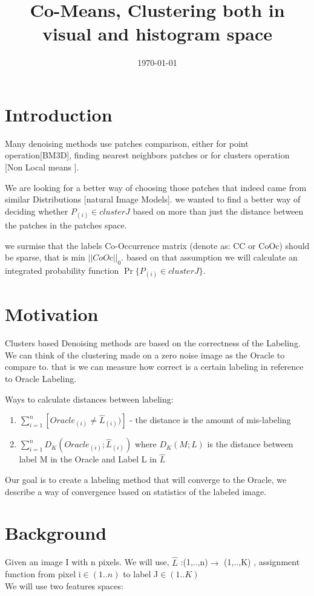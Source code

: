 \documentclass{article}
\title{Co-Means, Clustering both in visual and histogram space}
\author{}
\date{\today}
\begin{document}
\maketitle

\section{Introduction}
Many denoising methods use patches comparison, either for point operation[BM3D], finding nearest neighbors patches or for clusters operation [Non Local means ].

We are looking for a better way of choosing those patches that indeed came from similar Distributions [natural Image Models].
we wanted to find a better way of deciding whether $P_{(i)}\in cluster J$ based on more than just the distance between the patches in the patches space.

we surmise that the labels Co-Occurrence matrix (denote as: CC or CoOc) should be sparse, that is min $||CoOc||_0$. based on that assumption we will calculate an integrated probability function $\Pr \{P_{(i)}\in cluster J\}$.

\section{Motivation}
Clusters based Denoising methods are based on the correctness of the Labeling.
We can think of the clustering made on a zero noise image as the Oracle to compare to. that is we can measure how correct is a certain labeling in reference to Oracle Labeling.

Ways to calculate distances between labeling:
\begin{enumerate}
	\item $ \sum_{i=1}^{n} [Oracle_{(i)}\ne\hat{L}_{(i)})]$  - the distance is the amount of mis-labeling
	\item $ \sum_{i=1}^{n} D_K(Oracle_{(i)};\hat{L}_{(i)}) $ where $ D_K(M;L) $ is the distance between label M in the Oracle and Label L in $ \hat{L} $
\end{enumerate}
Our goal is to create a labeling method that will converge to the Oracle, we describe a way of convergence based on statistics of the labeled image.

\section{Background}
Given an image I with n pixels. We will use, $\hat L$ :(1,..,n)$\rightarrow$ (1,..,K) , assignment function from pixel i$\in(1..n)$ to label J$\in(1..K)$\\
We will use two features spaces:
\end{document}
